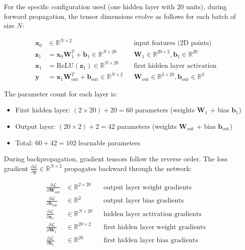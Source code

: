 \documentclass[11pt,a4paper]{article}
\begin{document}
For the specific configuration used (one hidden layer with 20 units), during forward propagation, the tensor dimensions evolve as follows for each batch of size $N$:

\begin{align*}
\mathbf{x}_0 &\in \mathbb{R}^{N \times 2} && \text{input features (2D points)} \\
\mathbf{z}_1 &= \mathbf{x}_0 \mathbf{W}_1^T + \mathbf{b}_1 \in \mathbb{R}^{N \times 20} && \mathbf{W}_1 \in \mathbb{R}^{20 \times 2}, \mathbf{b}_1 \in \mathbb{R}^{20} \\
\mathbf{x}_1 &= \text{ReLU}(\mathbf{z}_1) \in \mathbb{R}^{N \times 20} && \text{first hidden layer activation} \\
\mathbf{y} &= \mathbf{x}_1 \mathbf{W}_{\text{out}}^T + \mathbf{b}_{\text{out}} \in \mathbb{R}^{N \times 2} && \mathbf{W}_{\text{out}} \in \mathbb{R}^{2 \times 20}, \mathbf{b}_{\text{out}} \in \mathbb{R}^{2}
\end{align*}

The parameter count for each layer is:
\begin{itemize}
    \item First hidden layer: $(2 \times 20) + 20 = 60$ parameters (weights $\mathbf{W}_1$ + bias $\mathbf{b}_1$)
    \item Output layer: $(20 \times 2) + 2 = 42$ parameters (weights $\mathbf{W}_{\text{out}}$ + bias $\mathbf{b}_{\text{out}}$)
    \item Total: $60 + 42 = 102$ learnable parameters
\end{itemize}

During backpropagation, gradient tensors follow the reverse order. The loss gradient $\frac{\partial \mathcal{L}}{\partial \mathbf{y}} \in \mathbb{R}^{N \times 2}$ propagates backward through the network:

\begin{align*}
\frac{\partial \mathcal{L}}{\partial \mathbf{W}_{\text{out}}} &\in \mathbb{R}^{2 \times 20} && \text{output layer weight gradients} \\
\frac{\partial \mathcal{L}}{\partial \mathbf{b}_{\text{out}}} &\in \mathbb{R}^{2} && \text{output layer bias gradients} \\
\frac{\partial \mathcal{L}}{\partial \mathbf{x}_1} &\in \mathbb{R}^{N \times 20} && \text{hidden layer activation gradients} \\
\frac{\partial \mathcal{L}}{\partial \mathbf{W}_1} &\in \mathbb{R}^{20 \times 2} && \text{first hidden layer weight gradients} \\
\frac{\partial \mathcal{L}}{\partial \mathbf{b}_1} &\in \mathbb{R}^{20} && \text{first hidden layer bias gradients}
\end{align*}
\end{document}
